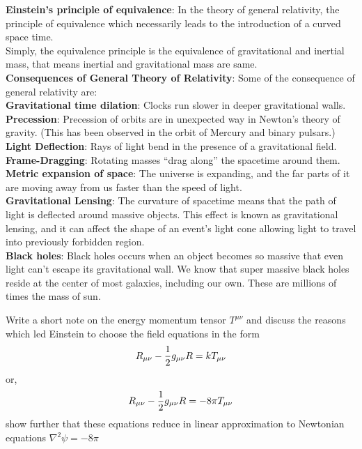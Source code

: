 \documentclass[../main-sheet.tex]{subfiles}
\begin{document}
        \begin{soln}
            \textbf{Einstein's principle of equivalence}: In the theory of general relativity, the principle of equivalence which necessarily leads to the introduction of a curved space time.\\
            Simply, the equivalence principle is the equivalence of gravitational and inertial mass, that means inertial and gravitational mass are same.\\

            \textbf{Consequences of General Theory of Relativity}: Some of the consequence of general relativity are:\\
            \textbf{Gravitational time dilation}: Clocks run slower in deeper gravitational walls.\\
            \textbf{Precession}: Precession of orbits are in unexpected way in Newton's theory of gravity. (This has been observed in the orbit of Mercury and binary pulsars.)\\
            \textbf{Light Deflection}: Rays of light bend in the presence of a gravitational field.\\
            \textbf{Frame-Dragging}: Rotating masses ``drag along'' the spacetime around them.\\
            \textbf{Metric expansion of space}: The universe is expanding, and the far parts of it are moving away from us faster than the speed of light.\\
            \textbf{Gravitational Lensing}: The curvature of spacetime means that the path of light is deflected around massive objects. This effect is known as gravitational lensing, and it can affect the shape of an event's light cone allowing light to travel into previously forbidden region.\\
            \textbf{Black holes}: Black holes occurs when an object becomes so massive that even light can't escape its gravitational wall. We know that super massive black holes reside at the center of most galaxies, including our own. These are millions of times the mass of sun.
        \end{soln}
        \begin{prob}[8]
            Write a short note on the energy momentum tensor \(T^{\mu\nu}\) and discuss the reasons which led Einstein to choose the field equations in the form
            \[ R_{{\mu\nu}}-\frac{1}{2}g_{\mu\nu} R=kT_{{\mu\nu}}\]
            or,
            \[ R_{{\mu\nu}}-\frac{1}{2}g_{\mu\nu} R=-8\pi T_{{\mu\nu}}\]
            show further that these equations reduce in linear approximation to Newtonian equations \(\nabla^2 \psi=-8\pi\)
        \end{prob}
\end{document}

